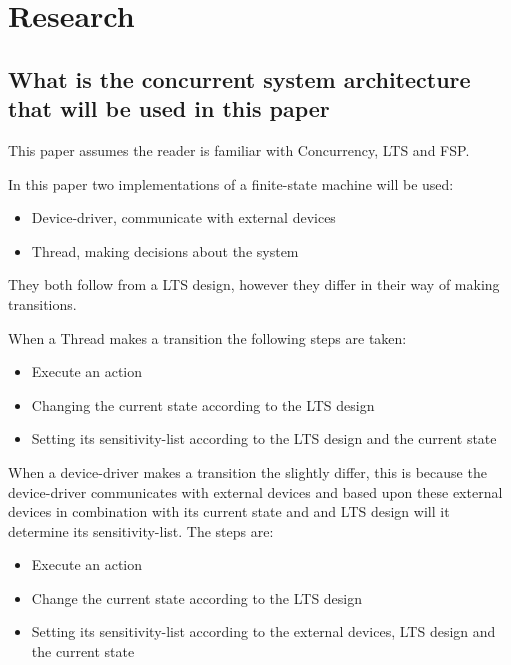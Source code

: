 \hypertarget{research}{%
\section{Research}\label{research}}

\hypertarget{what-is-the-concurrent-system-architecture-that-will-be-used-in-this-paper}{%
\subsection{What is the concurrent system architecture that will be used
in this
paper}\label{what-is-the-concurrent-system-architecture-that-will-be-used-in-this-paper}}

This paper assumes the reader is familiar with Concurrency, LTS and FSP.

In this paper two implementations of a finite-state machine will be
used:

\begin{itemize}
\tightlist
\item
  Device-driver, communicate with external devices
\item
  Thread, making decisions about the system
\end{itemize}

They both follow from a LTS design, however they differ in their way of
making transitions.

When a Thread makes a transition the following steps are taken:

\begin{itemize}
\tightlist
\item
  Execute an action
\item
  Changing the current state according to the LTS design
\item
  Setting its sensitivity-list according to the LTS design and the
  current state
\end{itemize}

When a device-driver makes a transition the slightly differ, this is
because the device-driver communicates with external devices and based
upon these external devices in combination with its current state and
and LTS design will it determine its sensitivity-list. The steps are:

\begin{itemize}
\tightlist
\item
  Execute an action
\item
  Change the current state according to the LTS design
\item
  Setting its sensitivity-list according to the external devices, LTS
  design and the current state
\end{itemize}

